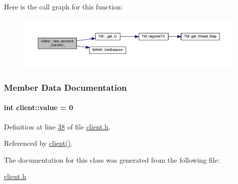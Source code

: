 Here is the call graph for this function\+:
\nopagebreak
\begin{figure}[H]
\begin{center}
\leavevmode
\includegraphics[width=350pt]{classclient_a71edd1265ba9ae03f71b5dbf54548696_a71edd1265ba9ae03f71b5dbf54548696_cgraph}
\end{center}
\end{figure}




\subsubsection{Member Data Documentation}
\paragraph[{\texorpdfstring{value}{value}}]{\setlength{\rightskip}{0pt plus 5cm}int client\+::value = 0}\hypertarget{classclient_a30e2070077d9ba875bfa6616a43d879c_a30e2070077d9ba875bfa6616a43d879c}{}\label{classclient_a30e2070077d9ba875bfa6616a43d879c_a30e2070077d9ba875bfa6616a43d879c}


Definition at line \hyperlink{client_8h_source_l00038}{38} of file \hyperlink{client_8h_source}{client.\+h}.



Referenced by \hyperlink{client_8h_source_l00039}{client()}.



The documentation for this class was generated from the following file\+:\begin{DoxyCompactItemize}
\item 
\hyperlink{client_8h}{client.\+h}\end{DoxyCompactItemize}
